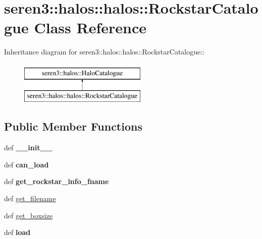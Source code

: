\hypertarget{classseren3_1_1halos_1_1halos_1_1RockstarCatalogue}{
\section{seren3::halos::halos::RockstarCatalogue Class Reference}
\label{classseren3_1_1halos_1_1halos_1_1RockstarCatalogue}
}
Inheritance diagram for seren3::halos::halos::RockstarCatalogue::\begin{figure}[H]
\begin{center}
\leavevmode
\includegraphics[height=2cm]{classseren3_1_1halos_1_1halos_1_1RockstarCatalogue}
\end{center}
\end{figure}
\subsection*{Public Member Functions}
\begin{DoxyCompactItemize}
\item 
\hypertarget{classseren3_1_1halos_1_1halos_1_1RockstarCatalogue_a9cc6cc02aaa5b00bb928c258ea77c576}{
def {\bfseries \_\-\_\-init\_\-\_\-}}
\label{classseren3_1_1halos_1_1halos_1_1RockstarCatalogue_a9cc6cc02aaa5b00bb928c258ea77c576}

\item 
\hypertarget{classseren3_1_1halos_1_1halos_1_1RockstarCatalogue_aac709561d206eba20981daeaefc5b238}{
def {\bfseries can\_\-load}}
\label{classseren3_1_1halos_1_1halos_1_1RockstarCatalogue_aac709561d206eba20981daeaefc5b238}

\item 
\hypertarget{classseren3_1_1halos_1_1halos_1_1RockstarCatalogue_aec69313605298331b8c4bccf31afd6e6}{
def {\bfseries get\_\-rockstar\_\-info\_\-fname}}
\label{classseren3_1_1halos_1_1halos_1_1RockstarCatalogue_aec69313605298331b8c4bccf31afd6e6}

\item 
def \hyperlink{classseren3_1_1halos_1_1halos_1_1RockstarCatalogue_ab55aae49df70e416fba591c9682c264b}{get\_\-filename}
\item 
def \hyperlink{classseren3_1_1halos_1_1halos_1_1RockstarCatalogue_a648f766d002674cc441e36260c98b02f}{get\_\-boxsize}
\item 
\hypertarget{classseren3_1_1halos_1_1halos_1_1RockstarCatalogue_a66c4c06bcb33666b7247f6b50bf49b3d}{
def {\bfseries load}}
\label{classseren3_1_1halos_1_1halos_1_1RockstarCatalogue_a66c4c06bcb33666b7247f6b50bf49b3d}

\end{DoxyCompactItemize}
